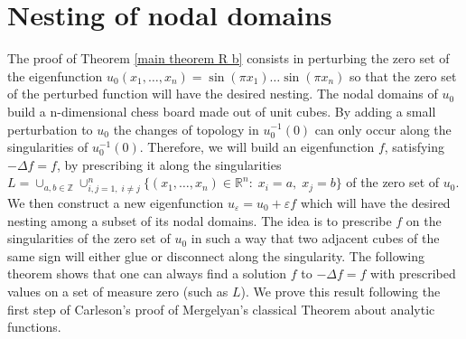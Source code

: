 \documentclass[11pt,reqno]{amsart}
\newcommand{\R}{{\mathbb R}}
\newcommand{\Z}{{\mathbb Z}}
\newcommand{\ep}{\varepsilon}
\theoremstyle{definition}
\begin{document}

\section{Nesting of nodal domains} \label{nesting}


The proof of Theorem \ref{main theorem R b} consists in perturbing the zero set of the eigenfunction 
$u_0(x_1,\dots,x_n)=\sin(\pi x_1)\dots\sin(\pi x_n)$ so that the zero set of the perturbed function  will have the desired nesting. The nodal domains of $u_0$ build a n-dimensional chess board made out of unit cubes. By adding a small perturbation to $u_0$ the changes of topology in $u_0^{-1}(0)$ can only occur along the singularities of $u_0^{-1}(0)$. Therefore, we will build an eigenfunction $f$, satisfying $-\Delta f=f$, by prescribing it  along the singularities $L=\cup_{a,b \in \Z} \cup_{i,j=1,\; i\neq j}^n \{(x_1, \dots, x_n) \in \R^n:\; x_i=a, \;x_j=b \}$ of the zero set of $u_0$. We then construct a new eigenfunction $u_\ep = u_0 + \ep f$ which will have the desired nesting among a subset of its nodal domains.   The idea is to prescribe $f$ on the singularities of the zero set of $u_0$ in such a way that two adjacent cubes of the same sign will either glue or disconnect along the singularity.    The following theorem shows that one can always find  a solution $f$ to $-\Delta f=f$ with prescribed values on a set of measure zero (such as  $L$).
We prove this result following the first step of Carleson's proof \cite{Car} of Mergelyan's classical Theorem about analytic functions.
\end{document}

